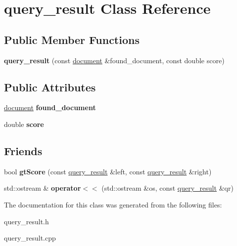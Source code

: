 \hypertarget{classquery__result}{}\section{query\+\_\+result Class Reference}
\label{classquery__result}
\subsection*{Public Member Functions}
\begin{DoxyCompactItemize}
\item 
\mbox{\label{classquery__result_a957a24bae5c9fcf83099d7fa2ece2647}} 
{\bfseries query\+\_\+result} (const \hyperlink{classdocument}{document} \&found\+\_\+document, const double score)
\end{DoxyCompactItemize}
\subsection*{Public Attributes}
\begin{DoxyCompactItemize}
\item 
\mbox{\label{classquery__result_a2f4b78686ff4f099b298424b9314cee4}} 
\hyperlink{classdocument}{document} {\bfseries found\+\_\+document}
\item 
\mbox{\label{classquery__result_aa385d79066a78d6b47d299ba4bf7f6e4}} 
double {\bfseries score}
\end{DoxyCompactItemize}
\subsection*{Friends}
\begin{DoxyCompactItemize}
\item 
\mbox{\label{classquery__result_af90a86217251694caa9471be14515ee9}} 
bool {\bfseries gt\+Score} (const \hyperlink{classquery__result}{query\+\_\+result} \&left, const \hyperlink{classquery__result}{query\+\_\+result} \&right)
\item 
\mbox{\label{classquery__result_aa97ddcf5d38eaf8c7160b9fe609170f5}} 
std\+::ostream \& {\bfseries operator$<$$<$} (std\+::ostream \&os, const \hyperlink{classquery__result}{query\+\_\+result} \&qr)
\end{DoxyCompactItemize}


The documentation for this class was generated from the following files\+:\begin{DoxyCompactItemize}
\item 
query\+\_\+result.\+h\item 
query\+\_\+result.\+cpp\end{DoxyCompactItemize}
